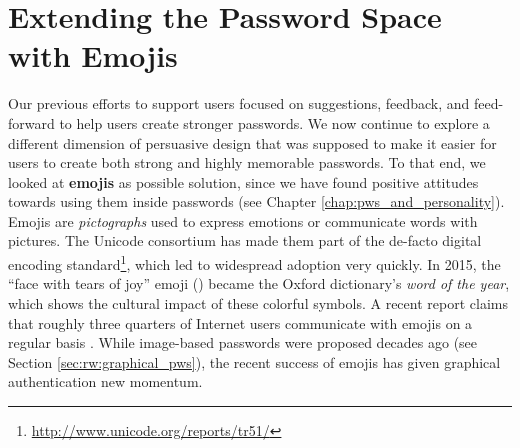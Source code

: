 \chapter[Extending the Password Space with Emojis]{Extending the Password Space with Emojis}\label{chap:emojipasswords}

Our previous efforts to support users focused on suggestions, feedback, and feed-forward to help users create stronger passwords. We now continue to explore a different dimension of persuasive design that was supposed to make it easier for users to create both strong and highly memorable passwords. To that end, we looked at \textbf{emojis} as possible solution, since we have found positive attitudes towards using them inside passwords (see Chapter \ref{chap:pws_and_personality}). Emojis are \textit{pictographs} used to express emotions or communicate words with pictures. The Unicode consortium has made them part of the de-facto digital encoding standard\footnote{\label{foot:emoji-standard}\url{http://www.unicode.org/reports/tr51/}}, which led to widespread adoption very quickly. In 2015, the ``face with tears of joy'' emoji () became the Oxford dictionary's \textit{word of the year}, which shows the cultural impact of these colorful symbols. A recent report claims that roughly three quarters of Internet users communicate with emojis on a regular basis \cite{EmogiResearch2016}. While image-based passwords were proposed decades ago (see Section \ref{sec:rw:graphical_pws}), the recent success of emojis has given graphical authentication new momentum. 

